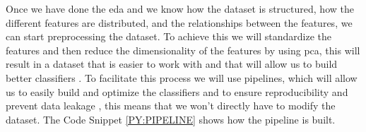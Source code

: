 Once we have done the \ac{eda} and we know how the dataset is structured, how the different features are distributed, and the relationships between the features, we can start preprocessing the dataset. To achieve this we will standardize the features and then reduce the dimensionality of the features by using \ac{pca}, this will result in a dataset that is easier to work with and that will allow us to build better classifiers \cite{dinc_evaluation_2014}. To facilitate this process we will use pipelines, which will allow us to easily build and optimize the classifiers and to ensure reproducibility and prevent data leakage \cite{zhao_pre-process_2019}, this means that we won't directly have to modify the dataset. The Code Snippet \ref{PY:PIPELINE} shows how the pipeline is built.

